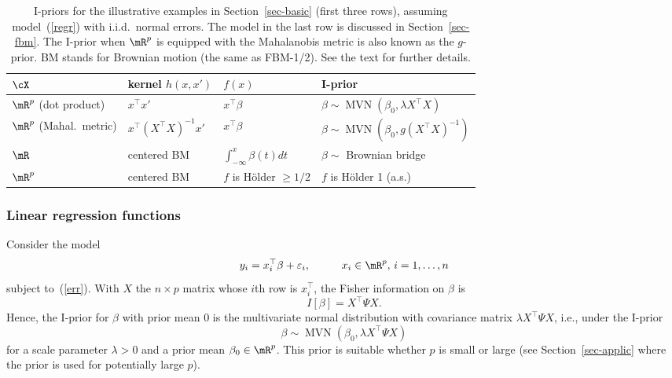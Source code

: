 \documentclass[preprint,12pt,authoryear]{elsarticle}
\DeclareMathOperator{\MVN}{MVN}
\begin{document}
\begin{table}
	\begin{tabular}{llll}
		$\cX$                           & kernel $h(x,x')$   & $f(x)$                         & I-prior \\ \hline
		$\mR^p$ (dot product)           & $x^\top x'$        & $x^\top\beta$                  & $\beta\sim\MVN(\beta_0,\lambda X^\top X)$    \\
		$\mR^p$ (Mahal.\ metric)        & $x^\top(X^\top X)^{-1} x'$        & $x^\top\beta$                  & $\beta\sim\MVN(\beta_0,g(X^\top X)^{-1})$    \\
		$\mR$                           & centered BM        & $\int_{-\infty}^x\beta(t)dt$   & $\beta\sim$ Brownian bridge    \\
		$\mR^p$                         & centered BM        & $f$ is H\"older $\ge 1/2$& $f$ is H\"older 1 (a.s.)    \\
	\end{tabular}
	\caption{I-priors for the illustrative examples in Section~\ref{sec-basic} (first three rows), assuming model~(\ref{regr}) with i.i.d.\  normal errors. The model in the last row is discussed in Section~\ref{sec-fbm}. The I-prior when $\mR^p$ is equipped with the Mahalanobis metric is also known as the $g$-prior. BM stands for Brownian motion (the same as FBM-1/2). See the text for further details.}
	\label{tbl-basic}
\end{table}




\subsubsection{Linear regression functions}\label{sec-lin}

Consider the model
\[  y_i = x_i^\top\beta + \varepsilon_i, \hspace{10mm}x_i\in\mR^p,\, i=1,\ldots,n \]
subject to~(\ref{err}). With $X$ the $n\times p$ matrix whose $i$th row is $x_i^\top$, the Fisher information on $\beta$ is
\[  I[\beta] = X^\top\Psi X . \]
Hence, the I-prior for $\beta$ with prior mean $0$ is the multivariate normal distribution with covariance matrix $\lambda X^\top\Psi X$,
i.e., under the I-prior
\begin{equation}\label{liniprior}  \beta\sim\MVN(\beta_0,\lambda X^\top\Psi X) \end{equation}
for a scale parameter $\lambda>0$ and a prior mean $\beta_0\in\mR^p$. 
This prior is suitable whether $p$ is small or large (see Section~\ref{sec-applic} where the prior is used for potentially large $p$).
\end{document}
